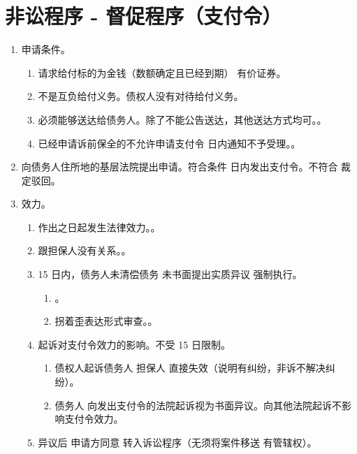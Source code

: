 \section{非讼程序 - 督促程序（支付令）}
\begin{enumerate}
  \item 申请条件。
        \begin{enumerate}
          \item 请求给付标的为金钱（数额确定且已经到期） \hz 有价证券。
          \item 不是互负给付义务。债权人没有对待给付义务。
          \item 必须能够送达给债务人。除了不能公告送达，其他送达方式均可。。
          \item 已经申请诉前保全的不允许申请支付令  日内通知不予受理。。
        \end{enumerate}
  \item 向债务人住所地的基层法院提出申请。符合条件  日内发出支付令。不符合 \yjt 裁定驳回。
  \item 效力。
        \begin{enumerate}
          \item 作出之日起发生法律效力。。
          \item 跟担保人没有关系。。
          \item 15 日内，债务人未清偿债务 \hz 未书面提出实质异议 \yjt 强制执行。
                \begin{enumerate}
                  \item {}。
                  \item 拐着歪表达形式审查。。
                \end{enumerate}
          \item 起诉对支付令效力的影响。不受 15 日限制。
                \begin{enumerate}
                  \item 债权人起诉债务人 \hz 担保人 \yjt 直接失效（说明有纠纷，非诉不解决纠纷）。
                  \item 债务人 \yi 向发出支付令的法院起诉视为书面异议。\er 向其他法院起诉不影响支付令效力。
                \end{enumerate}
          \item 异议后 \yjt 申请方同意 \yjt 转入诉讼程序（无须将案件移送 \yjt 有管辖权）。
        \end{enumerate}
\end{enumerate}
